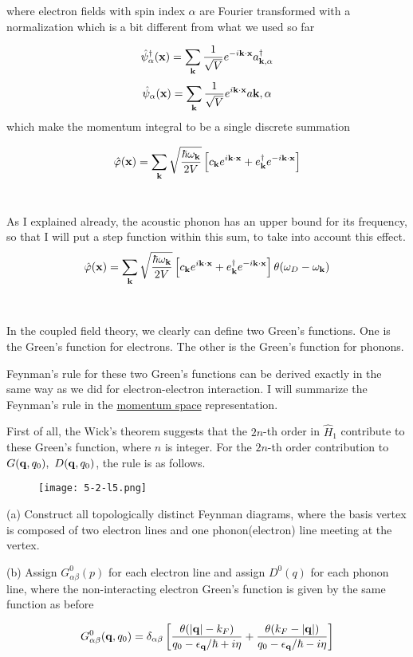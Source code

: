 where electron fields with spin index $\alpha$ are Fourier transformed with a normalization which is a bit different from what we used so far

\[\hat\psi_\alpha^\dagger({\bf x}) = \sum_{\bf k}\frac{1}{\sqrt{V}}e^{-i\bf k\cdot x}a^\dagger_{\bf k,\alpha} \]
\[\hat\psi_\alpha({\bf x}) = \sum_{\bf k}\frac{1}{\sqrt{V}}e^{i\bf k\cdot x}a{\bf k,\alpha} \]
which make the momentum integral to be a single discrete summation

\[\hat\varphi({\bf x})=\sum_{\bf k}\sqrt{\frac{\hbar\omega_{\bf k}}{2V}}\left[c_{\bf k}e^{i\bf k\cdot x}+e_{\bf k}^\dagger e^{-i\bf k\cdot x}\right] \]
\dotfill
\ 

As I explained already, the acoustic phonon has an upper bound for its frequency, so that I will put a step function within this sum, to take into account this effect. 
\[\hat\varphi({\bf x})=\sum_{\bf k}\sqrt{\frac{\hbar\omega_{\bf k}}{2V}}\left[c_{\bf k}e^{i\bf k\cdot x}+e_{\bf k}^\dagger e^{-i\bf k\cdot x}\right] \theta(\omega_D-\omega_{\bf k}) \]
\dotfill

\ 

In the coupled field theory, we clearly can define two Green's functions. One is the Green's function for electrons. The other is the Green's function for phonons. 



Feynman's rule for these two Green's functions can be derived exactly in the same way as we did for electron-electron interaction. I will summarize the Feynman's rule in the \uline{momentum space} representation. 

First of all, the Wick's theorem suggests that the $2n$-th order in $\hat{H}_1$ contribute to these Green's function, where $n$ is integer. For the $2n$-th order contribution to $G({\bf q},q_0),\ D({\bf q},q_0)$, the rule is as follows. 

\begin{wrapfigure}{l}{4cm}
\texttt{[image: 5-2-l5.png]}
\end{wrapfigure}
\noindent (a) Construct all topologically distinct Feynman diagrams, where the basis vertex is composed of two electron lines and one phonon(electron) line meeting at the vertex. 

\noindent (b) Assign $G_{\alpha\beta}^0(p)$ for each electron line and assign $D^0(q)$ for each phonon line, where the non-interacting electron Green's function is given by the same function as before

\[G_{\alpha\beta}^0({\bf q},q_0) = \delta_{\alpha\beta}\left[\frac{\theta(|{\bf q}|-k_F)}{q_0-\epsilon_{\bf q}/\hbar+i\eta} + \frac{\theta(k_F - |{\bf q}|)}{q_0-\epsilon_{\bf q}/\hbar-i\eta}\right] \]

